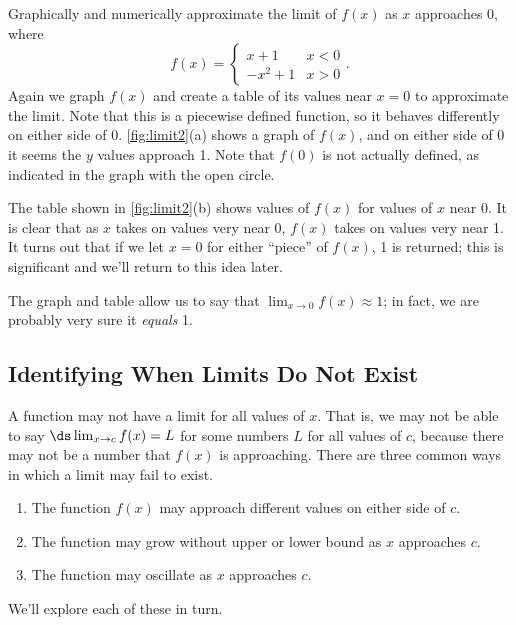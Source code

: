 \begin{example}\label{ex_limit2}%
Graphically and numerically approximate the limit of $f(x)$ as $x$ approaches 0, where\vspace{-.3\baselineskip}
\[f(x) = \begin{cases} x+1 & x< 0 \\ -x^2+1 & x > 0 \end{cases}.\]
\solution
Again we graph $f(x)$ and create a table of its values near $x=0$ to approximate the limit. Note that this is a piecewise defined function, so it behaves differently on either side of 0. \autoref{fig:limit2}(a) shows a graph of $f(x)$, and on either side of 0 it seems the $y$ values approach 1. Note that $f(0)$ is not actually defined, as indicated in the graph with the open circle.

The table shown in \autoref{fig:limit2}(b) shows values of $f(x)$ for values of $x$ near 0. It is clear that as $x$ takes on values very near 0, $f(x)$ takes on values very near 1. It turns out that if we let $x=0$ for either ``piece'' of $f(x)$, 1 is returned; this is significant and we'll return to this idea later.

The graph and table allow us to say that $\lim_{x\to 0}f(x) \approx 1$; in fact, we are probably very sure it \emph{equals} 1.
\end{example}

\subsection{Identifying When Limits Do Not Exist}

A function may not have a limit for all values of $x$. That is, we may not be able to say $\ds\lim_{x\to c}f(x)=L$ for some numbers $L$ for all values of $c$, because there may not be a number that $f(x)$ is approaching. There are three common ways in which a limit may fail to exist. 
\begin{enumerate}
	\item	The function $f(x)$ may approach different values on either side of $c$.
	\item	The function may grow without upper or lower bound as $x$ approaches $c$.
	\item	The function may oscillate as $x$ approaches $c$.
\end{enumerate}

We'll explore each of these in turn.\bigskip

